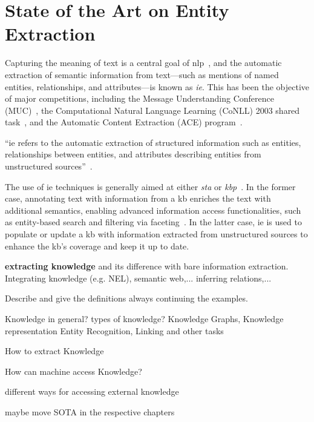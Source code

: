 \section{State of the Art on Entity Extraction}
\label{sec:information_extraction}

Capturing the meaning of text is a central goal of \acl{nlp}~\cite{entityorientedsearch2018balog}, and the automatic extraction of semantic information from text---such as mentions of named entities, relationships, and attributes---is known as \emph{\acl{ie}}. This has been the objective of major competitions, including the Message Understanding Conference (MUC)~\cite{muc_lessons_1998,muc6_overview_1995,muc7_overview_1998}, the Computational Natural Language Learning (CoNLL) 2003 shared task~\cite{conll2003}, and the Automatic Content Extraction (ACE) program~\cite{ace_2004}.

\begin{definition}
``\Acf{ie} refers to the automatic extraction of structured information such as entities, relationships between entities, and attributes describing entities from unstructured sources''~\cite{infoextraction2008}.
\end{definition}
The use of \ac{ie} techniques is generally aimed at either \emph{\acl{sta}} or \emph{\acl{kbp}}~\cite{entityorientedsearch2018balog}.
In the former case, annotating text with information from a \ac{kb} enriches the text with additional semantics, enabling advanced information access functionalities, such as entity-based search and filtering via faceting~\cite{entityorientedsearch2018balog}.
In the latter case, \ac{ie} is used to populate or update a \ac{kb} with information extracted from unstructured sources to enhance the \ac{kb}'s coverage and keep it up to date.




\textbf{extracting knowledge} and its difference with bare information extraction. Integrating knowledge (e.g. NEL), semantic web,... inferring relations,...

Describe and give the definitions always continuing the examples.

Knowledge in general? types of knowledge? Knowledge Graphs, Knowledge representation
Entity Recognition, Linking and other tasks

How to extract Knowledge

How can machine access Knowledge?

different ways for accessing external knowledge

maybe move SOTA in the respective chapters
